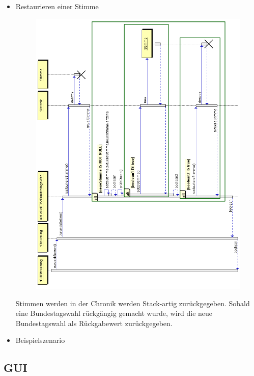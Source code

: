 \documentclass[12pt,a4paper,titlepage]{article}
\begin{document}
\begin{itemize}
\begin{figure}
	\end{figure}
		\item Restaurieren einer Stimme \\
		\begin{figure}
		\centering
		\includegraphics[scale=0.7]{Sequenzdiagramme/Chronik_Sequenzdiagramm-restaurieren.png}
				\\
		\end{figure}
		
		Stimmen werden in der Chronik werden Stack-artig zurückgegeben. Sobald eine Bundestagswahl rückgängig gemacht wurde, wird die neue Bundestagswahl als Rückgabewert zurückgegeben.
	\item Beispielszenario	
\end{itemize}

\newpage
\subsection{GUI}
\end{document}
